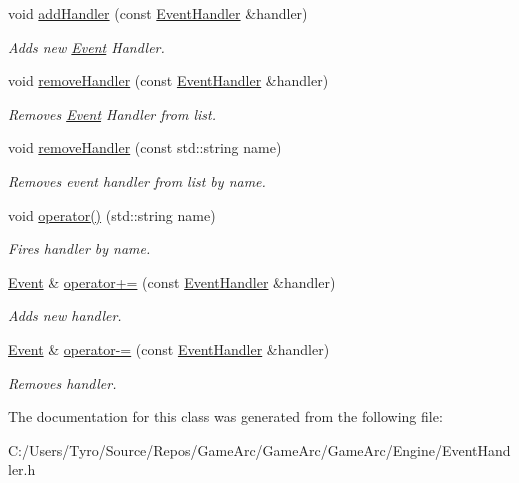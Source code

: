 \begin{DoxyCompactItemize}
\mbox{\label{class_event_a6860c013fdd5c1bfea9c49fb6b627442}} 
void \mbox{\hyperlink{class_event_a6860c013fdd5c1bfea9c49fb6b627442}{add\+Handler}} (const \mbox{\hyperlink{class_event_handler}{Event\+Handler}} \&handler)
\begin{DoxyCompactList}\small\item\em Adds new \mbox{\hyperlink{class_event}{Event}} Handler. \end{DoxyCompactList}\item 
\mbox{\label{class_event_a2f1428fb85f6b18a4ebda87b4dd4c52a}} 
void \mbox{\hyperlink{class_event_a2f1428fb85f6b18a4ebda87b4dd4c52a}{remove\+Handler}} (const \mbox{\hyperlink{class_event_handler}{Event\+Handler}} \&handler)
\begin{DoxyCompactList}\small\item\em Removes \mbox{\hyperlink{class_event}{Event}} Handler from list. \end{DoxyCompactList}\item 
\mbox{\label{class_event_aa747543d37a7c6a5f36a8ae936b2570f}} 
void \mbox{\hyperlink{class_event_aa747543d37a7c6a5f36a8ae936b2570f}{remove\+Handler}} (const std\+::string name)
\begin{DoxyCompactList}\small\item\em Removes event handler from list by name. \end{DoxyCompactList}\item 
\mbox{\label{class_event_a2d7239dd7af997cfe4d52a5e3338a84e}} 
void \mbox{\hyperlink{class_event_a2d7239dd7af997cfe4d52a5e3338a84e}{operator()}} (std\+::string name)
\begin{DoxyCompactList}\small\item\em Fires handler by name. \end{DoxyCompactList}\item 
\mbox{\label{class_event_a76d4a7410cab58baeb0b7f2bf6adb4a4}} 
\mbox{\hyperlink{class_event}{Event}} \& \mbox{\hyperlink{class_event_a76d4a7410cab58baeb0b7f2bf6adb4a4}{operator+=}} (const \mbox{\hyperlink{class_event_handler}{Event\+Handler}} \&handler)
\begin{DoxyCompactList}\small\item\em Adds new handler. \end{DoxyCompactList}\item 
\mbox{\label{class_event_ab5cdb51d593ed01fcd4d1c8dd781db72}} 
\mbox{\hyperlink{class_event}{Event}} \& \mbox{\hyperlink{class_event_ab5cdb51d593ed01fcd4d1c8dd781db72}{operator-\/=}} (const \mbox{\hyperlink{class_event_handler}{Event\+Handler}} \&handler)
\begin{DoxyCompactList}\small\item\em Removes handler. \end{DoxyCompactList}\end{DoxyCompactItemize}


The documentation for this class was generated from the following file\+:\begin{DoxyCompactItemize}
\item 
C\+:/\+Users/\+Tyro/\+Source/\+Repos/\+Game\+Arc/\+Game\+Arc/\+Game\+Arc/\+Engine/Event\+Handler.\+h\end{DoxyCompactItemize}
